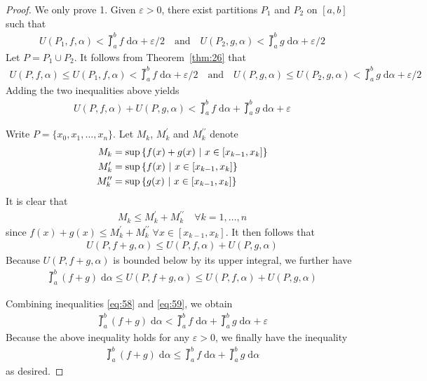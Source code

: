 \documentclass[thmcnt=section, 12pt]{my-elegantbook}
\begin{document}
\begin{proof}
    We only prove 1. Given $\varepsilon > 0$, there exist partitions $P_1$ and $P_2$ on $[a, b]$ such that 
    \begin{align*}
        U(P_1,f,\alpha) < \upint_a^b f \; \mathrm{d}\alpha + \varepsilon/2
        \quad \text{and} \quad
        U(P_2,g,\alpha) < \upint_a^b g \; \mathrm{d}\alpha + \varepsilon/2
    \end{align*}
    Let $P = P_1 \cup P_2$. It follows from Theorem~\ref{thm:26} that 
    \begin{align*}
        U(P,f,\alpha) \leq U(P_1,f,\alpha) < \upint_a^b f \; \mathrm{d}\alpha + \varepsilon/2
        \quad \text{and} \quad
        U(P,g,\alpha) \leq U(P_2,g,\alpha) < \upint_a^b g \; \mathrm{d}\alpha + \varepsilon/2
    \end{align*}
    Adding the two inequalities above yields 
    \begin{align}
        U(P,f,\alpha) + U(P,g,\alpha) 
        < \upint_a^b f \; \mathrm{d}\alpha +  \upint_a^b g \; \mathrm{d}\alpha + \varepsilon
        \label{eq:58}
    \end{align}

    Write $P=\{ x_0, x_1, \ldots, x_n \}$. Let $M_k$, $M_k^\prime$ and $M_k^{\prime\prime}$ denote
    \begin{align*}
        M_k &= \sup \left\{ f(x) + g(x) \ \middle| \ x \in [x_{k-1}, x_k] \right\} \\ 
        M_k^\prime &= \sup \left\{ f(x) \ \middle| \ x \in [x_{k-1}, x_k] \right\} \\ 
        M_k^{\prime\prime} &= \sup \left\{ g(x) \ \middle| \ x \in [x_{k-1}, x_k] \right\}
    \end{align*}
    It is clear that 
    \begin{align*}
        M_k \leq M_k^\prime + M_k^{\prime\prime}
        \quad \forall k = 1, \ldots, n
    \end{align*}
    since $f(x) + g(x) \leq M_k^\prime + M_k^{\prime\prime} \; \forall x \in [x_{k-1}, x_k]$. It then follows that 
    \begin{align*}
        U(P,f+g,\alpha) \leq U(P,f,\alpha) + U(P,g,\alpha)
    \end{align*}
    Because $U(P,f+g,\alpha)$ is bounded below by its upper integral, we further have
    \begin{align}
        \upint_a^b (f+g) \; \mathrm{d}\alpha
        \leq U(P,f+g,\alpha) \leq U(P,f,\alpha) + U(P,g,\alpha)
        \label{eq:59}
    \end{align}

    Combining inequalities \eqref{eq:58} and \eqref{eq:59}, we obtain
    \begin{align*}
        \upint_a^b (f+g) \; \mathrm{d}\alpha
        < \upint_a^b f \; \mathrm{d}\alpha +  \upint_a^b g \; \mathrm{d}\alpha + \varepsilon
    \end{align*}
    Because the above inequality holds for any $\varepsilon > 0$, we finally have the inequality
    \begin{align*}
        \upint_a^b (f+g) \; \mathrm{d}\alpha
        \leq \upint_a^b f \; \mathrm{d}\alpha +  \upint_a^b g \; \mathrm{d}\alpha
    \end{align*}
    as desired.
\end{proof}
\end{document}
